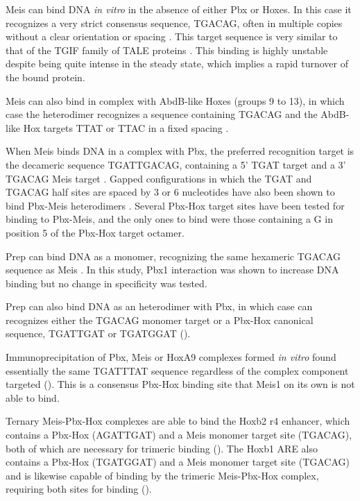 Meis can bind DNA \textit{in vitro} in the absence of either Pbx or Hoxes. In this case it recognizes a very strict consensus sequence, TGACAG, often in multiple copies without a clear orientation or spacing \parencite{Shen1997}. This target sequence is very similar to that of the TGIF family of TALE proteins \cite{ref}. This binding is highly unstable despite being quite intense in the steady state, which implies a rapid turnover of the bound protein. 

Meis can also bind in complex with AbdB-like Hoxes (groups 9 to 13), in which case the heterodimer recognizes a sequence containing TGACAG and the AbdB-like Hox targets TTAT or TTAC in a fixed spacing \parencite{Shen1997}.

When Meis binds DNA in a complex with Pbx, the preferred recognition target is the decameric sequence TGATTGACAG, containing a 5' TGAT target and a 3' TGACAG Meis target \parencite{Chang1997, Knoepfler1997}. Gapped configurations in which the TGAT and TGACAG half sites are spaced by 3 or 6 nucleotides have also been shown to bind Pbx-Meis heterodimers \parencite{Jacobs1999}. Several Pbx-Hox target sites have been tested for binding to Pbx-Meis, and the only ones to bind were those containing a G in position 5 of the Pbx-Hox target octamer. %

Prep can bind DNA as a monomer, recognizing the same hexameric TGACAG sequence as Meis \parencite{Berthelsen1998a}. In this study, Pbx1 interaction was shown to increase DNA binding but no change in specificity was tested.

Prep can also bind DNA as an heterodimer with Pbx, in which case can recognizes either the TGACAG monomer target or a Pbx-Hox canonical sequence, TGATTGAT or TGATGGAT (\cite{Berthelsen1998}).%




Immunoprecipitation of Pbx, Meis or HoxA9 complexes formed \textit{in vitro} found essentially the same TGATTTAT sequence regardless of the complex component targeted (\cite{Shen1999}). This is a consensus Pbx-Hox binding site that Meis1 on its own is not able to bind.

Ternary Meis-Pbx-Hox complexes are able to bind the Hoxb2 r4 enhancer, which contains a Pbx-Hox (AGATTGAT) and a Meis monomer target site (TGACAG), both of which are necessary for trimeric binding (\cite{Jacobs1999}). The Hoxb1 \ac{ARE} also contains a Pbx-Hox (TGATGGAT) and a Meis monomer target site (TGACAG) and is likewise capable of binding by the trimeric Meis-Pbx-Hox complex, requiring both sites for binding (\cite{Jacobs1999}).


